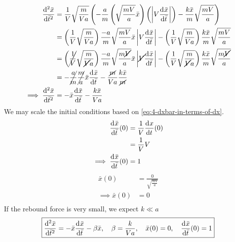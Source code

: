 \documentclass[12pt]{article}
\begin{document}
\begin{equation*}
  \begin{aligned}
    \od[2]{\bar{x}}{\bar{t}} &= \frac{1}{V}\sqrt{\frac{m}{Va}} \left(
    -\frac{a}{m}\left( \sqrt{\frac{mV}{a}}\bar{x}\right) \left(
    \abs{V\od{\bar{x}}{\bar{t}}}\right) -
    \frac{k\bar{x}}{m}\sqrt{\frac{mV}{a}}\right) \\
    &= \left(\frac{1}{V}\sqrt{\frac{m}{Va}}\right)\frac{-a}{m}\sqrt{\frac{mV}{a}}\bar{x}
    \abs{V\od{\bar{x}}{\bar{t}}} -
    \left(\frac{1}{V}\sqrt{\frac{m}{Va}}\right)\frac{k\bar{x}}{m}\sqrt{\frac{mV}{a}} \\
    &= \left(\cancel{\frac{1}{V}}\sqrt{\frac{m}{\cancel{V}a}}\right)\frac{-a}{m}\sqrt{\frac{m\cancel{V}}{a}}\bar{x}
    \abs{\cancel{V}\od{\bar{x}}{\bar{t}}} -
    \left(\frac{1}{V}\sqrt{\frac{m}{\cancel{V}a}}\right)\frac{k\bar{x}}{m}\sqrt{\frac{m\cancel{V}}{a}} \\
    &= -\cancel{\frac{a}{m}}\cancel{\frac{m}{a}}\bar{x}\od{\bar{x}}{\bar{t}} -
    \frac{\cancel{m}}{Va}\frac{k\bar{x}}{\cancel{m}} \\
    \implies \od[2]{\bar{x}}{\bar{t}} &= -\bar{x}\od{\bar{x}}{\bar{t}} - \frac{k\bar{x}}{Va} \\
  \end{aligned}
\end{equation*}
We may scale the initial conditions based on \cref{eq:4-dxbar-in-terms-of-dx}.
\begin{equation*}
  \begin{aligned}
    \od{\bar{x}}{\bar{t}}(0) &= \frac{1}{V}\od{x}{t}(0) \\
     &= \frac{1}{V}V \\
    \implies \od{\bar{x}}{\bar{t}}(0) &= 1 \\
  \end{aligned}
\end{equation*}
\begin{equation}
  \begin{aligned}
    \bar{x}(0) &= \frac{0}{\sqrt{\frac{mV}{a}}} \\
    \implies \bar{x}(0) &= 0 \\
  \end{aligned}
\end{equation}
If the rebound force is very small, we expect $k\ll a$
\begin{equation*} \boxed{
    \od[2]{\bar{x}}{\bar{t}} = -\bar{x}\od{\bar{x}}{\bar{t}} - \beta\bar{x},
    \quad\beta=\frac{k}{Va},\quad \bar{x}(0)=0,
    \quad\od{\bar{x}}{\bar{t}}(0) = 1
  }
\end{equation*}
\end{document}
